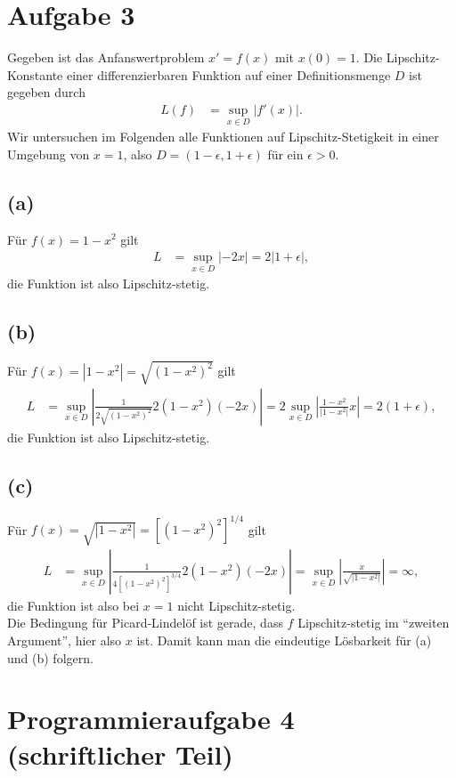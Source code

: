 \documentclass[english, parskip=full]{scrartcl}
\begin{document}
\section*{Aufgabe 3}
Gegeben ist das Anfanswertproblem $x'=f(x)$ mit $x(0)=1$.
Die Lipschitz-Konstante einer differenzierbaren Funktion auf einer Definitionsmenge $D$ ist gegeben durch
\begin{align}
L(f) &= \sup_{x\in D} |f'(x)|.
\end{align}
Wir untersuchen im Folgenden alle Funktionen auf Lipschitz-Stetigkeit in einer Umgebung von $x=1$, also $D= (1-\epsilon, 1+\epsilon)$ für ein $\epsilon>0$.
\subsection*{(a)} 
Für $f(x)=1-x^2$ gilt 
\begin{align}
L &= \sup_{x\in D} |-2x| = 2|1+\epsilon|,
\end{align}
die Funktion ist also Lipschitz-stetig.
\subsection*{(b)} 
Für $f(x)=|1-x^2| = \sqrt{(1-x^2)^2}$ gilt 
\begin{align}
L &= \sup_{x\in D} \left\vert \frac{1}{2\sqrt{(1-x^2)^2}} 2(1-x^2)(-2x) \right\vert = 2\sup_{x\in D}  \left\vert \frac{1-x^2}{|1-x^2|} x \right\vert = 2(1+\epsilon),
\end{align}
die Funktion ist also Lipschitz-stetig.
\subsection*{(c)} 
Für $f(x)= \sqrt{|1-x^2|} = [(1-x^2)^2]^{1/4}$ gilt 
\begin{align}
L &= \sup_{x\in D} \left\vert \frac{1}{4[(1-x^2)^2]^{3/4}} 2(1-x^2)(-2x) \right\vert = \sup_{x\in D}  \left\vert \frac{x}{\sqrt{|1-x^2|}} \right\vert = \infty,
\end{align}
die Funktion ist also bei $x=1$ nicht Lipschitz-stetig.
\\
Die Bedingung für Picard-Lindelöf ist gerade, dass $f$ Lipschitz-stetig im ``zweiten Argument'', hier also $x$ ist.
Damit kann man die eindeutige Lösbarkeit für (a) und (b) folgern.


\section*{Programmieraufgabe 4 (schriftlicher Teil)}

\end{document}
